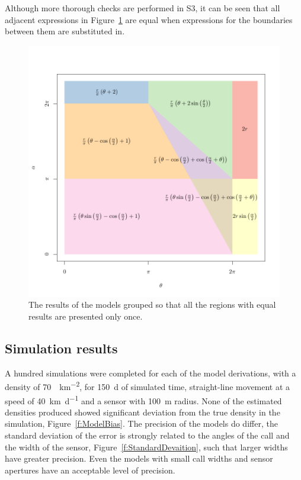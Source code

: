 \documentclass[a4paper,10pt,reqno,oneside]{amsart}
\begin{document}
Although more thorough checks are performed in S3, it can be seen that all adjacent expressions in Figure~\ref{f:equalModelResults} are equal when expressions for the boundaries between them are substituted in.

\begin{figure}
\centering
\includegraphics[width=1\textwidth]{imgs/equalModelResults.pdf}
\caption{The results of the models grouped so that all the regions with equal results are presented only once.}
\label{f:equalModelResults}
\end{figure}




\subsection{Simulation results}

A hundred simulations were completed for each of the model derivations, with a density of   \SI{70}{\animals\per\kilo\meter\squared}, for \SI{150}{\day} of simulated time, straight-line movement at a speed of \SI{40}{\kilo\meter\per\day} and a sensor with \SI{100}{\meter} radius. None of the estimated densities produced showed significant deviation from the true density in the simulation, Figure~\ref{f:ModelBias}. The precision of the models do differ, the standard deviation of the error is strongly related to the angles of the call and the width of the sensor, Figure~\ref{f:StandardDevaition}, such that larger widths have greater precision. Even the models with small call widths and sensor apertures have an acceptable level of precision. 
\end{document}
